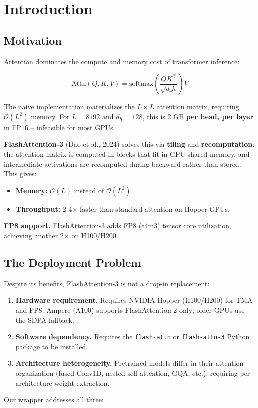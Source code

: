 \section{Introduction}

\subsection{Motivation}

Attention dominates the compute and memory cost of transformer inference:

\[
\text{Attn}(Q, K, V) = \text{softmax}\!\left(\frac{Q K^\top}{\sqrt{d\_h}}\right) V
\tag{1.1}
\]

The naive implementation materializes the $L \times L$ attention matrix, 
requiring $\mathcal{O}(L^2)$ memory. For $L = 8192$ and $d_h = 128$, this 
is 2 GB \textbf{per head, per layer} in FP16 -- infeasible for most GPUs.

\textbf{FlashAttention-3} (Dao et al., 2024) solves this via \textbf{tiling} and 
\textbf{recomputation}: the attention matrix is computed in blocks that fit in 
GPU shared memory, and intermediate activations are recomputed during 
backward rather than stored. This gives:

\begin{itemize}
\item \textbf{Memory:} $\mathcal{O}(L)$ instead of $\mathcal{O}(L^2)$.
\item \textbf{Throughput:} 2-4$\times$ faster than standard attention on Hopper GPUs.

\end{itemize}
\textbf{FP8 support.} FlashAttention-3 adds FP8 (e4m3) tensor core utilization, 
achieving another 2$\times$ on H100/H200.

\subsection{The Deployment Problem}

Despite its benefits, FlashAttention-3 is not a drop-in replacement:

\begin{enumerate}
\item \textbf{Hardware requirement.} Requires NVIDIA Hopper (H100/H200) for
  TMA and FP8. Ampere (A100) supports FlashAttention-2 only; older GPUs
  use the SDPA fallback.
\item \textbf{Software dependency.} Requires the \texttt{flash-attn} or \texttt{flash-attn-3}
  Python package to be installed.
\item \textbf{Architecture heterogeneity.} Pretrained models differ in their
  attention organization (fused Conv1D, nested self-attention, GQA, etc.),
  requiring per-architecture weight extraction.

\end{enumerate}
Our wrapper addresses all three:

